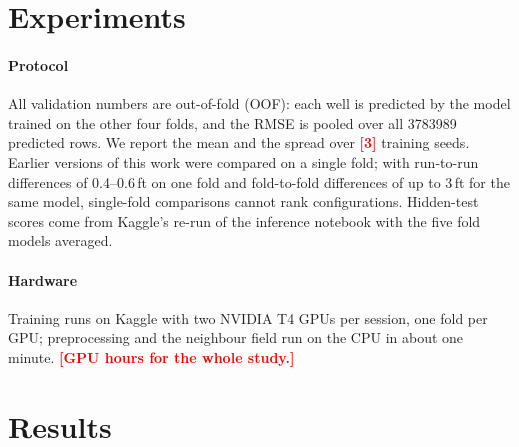 \documentclass[preprint,12pt,authoryear]{elsarticle}
\newcommand{\PH}[1]{\textcolor{red}{\textbf{[#1]}}}
\begin{document}
\section{Experiments}\label{sec:experiments}
\paragraph{Protocol}
All validation numbers are out-of-fold (OOF): each well is predicted by the model trained on the other four folds, and the RMSE is pooled over all \num{3783989} predicted rows. We report the mean and the spread over \PH{3} training seeds. Earlier versions of this work were compared on a single fold; with run-to-run differences of 0.4--0.6\,ft on one fold and fold-to-fold differences of up to 3\,ft for the same model, single-fold comparisons cannot rank configurations. Hidden-test scores come from Kaggle's re-run of the inference notebook with the five fold models averaged.

\paragraph{Hardware}
Training runs on Kaggle with two NVIDIA T4 GPUs per session, one fold per GPU; preprocessing and the neighbour field run on the CPU in about one minute. \PH{GPU hours for the whole study.}

\section{Results}\label{sec:results}
\end{document}
